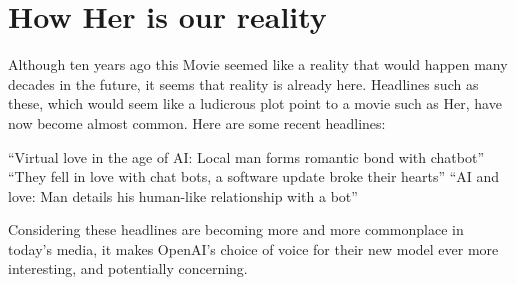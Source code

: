 \section{How Her is our reality}
\label{sec:ai}


   
Although ten years ago this Movie seemed like a reality that would happen many decades in the future, it seems that reality is already here. Headlines such as these, which would seem like a ludicrous plot point to a movie such as Her, have now become almost common. Here are some recent headlines: 
   
“Virtual love in the age of AI: Local man forms romantic bond with chatbot” 
   “They fell in love with chat bots, a software update broke their hearts”
   “AI and love: Man details his human-like relationship with a bot”
   
   Considering these headlines are becoming more and more commonplace in today's media, it makes OpenAI’s choice of voice for their new model ever more interesting, and potentially concerning. 

